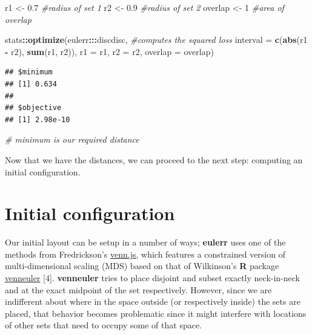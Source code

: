 \documentclass[
  headsepline=true,headings=standardclasses%
]{scrartcl}
\newenvironment{Shaded}{\begin{snugshade}}{\end{snugshade}}
\newcommand{\KeywordTok}[1]{\textcolor[rgb]{0.13,0.29,0.53}{\textbf{#1}}}
\newcommand{\DataTypeTok}[1]{\textcolor[rgb]{0.13,0.29,0.53}{#1}}
\newcommand{\DecValTok}[1]{\textcolor[rgb]{0.00,0.00,0.81}{#1}}
\newcommand{\FloatTok}[1]{\textcolor[rgb]{0.00,0.00,0.81}{#1}}
\newcommand{\StringTok}[1]{\textcolor[rgb]{0.31,0.60,0.02}{#1}}
\newcommand{\CommentTok}[1]{\textcolor[rgb]{0.56,0.35,0.01}{\textit{#1}}}
\newcommand{\OperatorTok}[1]{\textcolor[rgb]{0.81,0.36,0.00}{\textbf{#1}}}
\newcommand{\NormalTok}[1]{#1}
\theoremstyle{definition}
\theoremstyle{definition}
\theoremstyle{remark}
\begin{document}
\begin{Shaded}
\begin{Highlighting}[]
\NormalTok{r1 <-}\StringTok{ }\FloatTok{0.7} \CommentTok{#radius of set 1}
\NormalTok{r2 <-}\StringTok{ }\FloatTok{0.9} \CommentTok{#radius of set 2}
\NormalTok{overlap <-}\StringTok{ }\DecValTok{1} \CommentTok{#area of overlap}

\NormalTok{stats}\OperatorTok{::}\KeywordTok{optimize}\NormalTok{(eulerr}\OperatorTok{:::}\NormalTok{discdisc, }\CommentTok{#computes the squared loss}
                \DataTypeTok{interval =} \KeywordTok{c}\NormalTok{(}\KeywordTok{abs}\NormalTok{(r1 }\OperatorTok{-}\StringTok{ }\NormalTok{r2), }\KeywordTok{sum}\NormalTok{(r1, r2)),}
                \DataTypeTok{r1 =}\NormalTok{ r1,}
                \DataTypeTok{r2 =}\NormalTok{ r2,}
                \DataTypeTok{overlap =}\NormalTok{ overlap)}
\end{Highlighting}
\end{Shaded}

\begin{verbatim}
## $minimum
## [1] 0.634
## 
## $objective
## [1] 2.98e-10
\end{verbatim}

\begin{Shaded}
\begin{Highlighting}[]
\CommentTok{# minimum is our required distance}
\end{Highlighting}
\end{Shaded}

Now that we have the distances, we can proceed to the next step:
computing an initial configuration.

\section{Initial configuration}\label{initial-configuration}

Our initial layout can be setup in a number of ways; \textbf{eulerr}
uses one of the methods from Fredrickson's
\href{https://github.com/benfred/venn.js/}{venn.js}, which features a
constrained version of multi-dimensional scaling (MDS) based on that of
Wilkinson's \textbf{R} package
\href{https://CRAN.R-project.org/package=venneuler}{venneuler} {[}4{]}.
\textbf{venneuler} tries to place disjoint and subset exactly
neck-in-neck and at the exact midpoint of the set respectively. However,
since we are indifferent about where in the space outside (or
respectively inside) the sets are placed, that behavior becomes
problematic since it might interfere with locations of other sets that
need to occupy some of that space.
\end{document}
